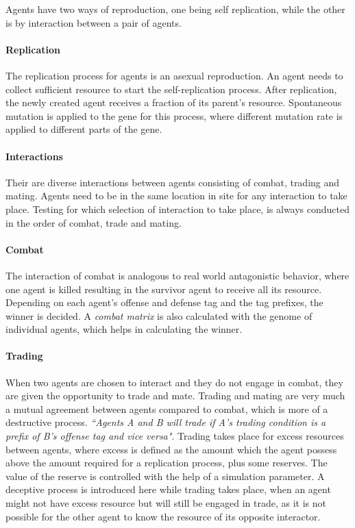 Agents have two ways of reproduction, one being self replication, while the other is by interaction between a pair of agents. 

\paragraph{Replication}
The replication process for agents is an asexual reproduction. An agent needs to collect sufficient resource to start the self-replication process. After replication, the newly created agent receives a fraction of its parent's resource. Spontaneous mutation is applied to the gene for this process, where different mutation rate is applied to different parts of the gene. 

\paragraph{Interactions}
Their are diverse interactions between agents consisting of combat, trading and mating. Agents need to be in the same location in site for any interaction to take place. Testing for which selection of interaction to take place, is always conducted in the order of combat, trade and mating.

\paragraph{Combat}
The interaction of combat is analogous to real world antagonistic behavior, where one agent is killed resulting in the survivor agent to receive all its resource. Depending on each agent's offense and defense tag and the tag prefixes, the winner is decided. A \textsl{combat matrix} is also calculated with the genome of individual agents, which helps in calculating the winner.

\paragraph{Trading}
When two agents are chosen to interact and they do not engage in combat, they are given the opportunity to trade and mate. Trading and mating are very much a mutual agreement between agents compared to combat, which is more of a destructive process. \textsl{``Agents A and B will trade if A's trading condition is a prefix of B's offense tag and vice versa"}. Trading takes place for excess resources between agents, where excess is defined as the amount which the agent possess above the amount required for a replication process, plus some reserves. The value of the reserve is controlled with the help of a simulation parameter. A deceptive process is introduced here while trading takes place, when an agent might not have excess resource but will still be engaged in trade, as it is not possible for the other agent to know the resource of its opposite interactor. 

